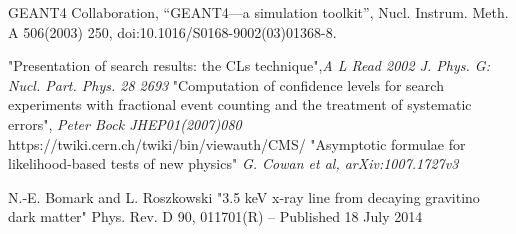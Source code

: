 \begin{thebibliography}{9}
 GEANT4 Collaboration, “GEANT4—a simulation toolkit”, Nucl. Instrum. Meth. A 506(2003) 250, doi:10.1016/S0168-9002(03)01368-8.

 "Presentation of search results: the CLs technique",\textit{A L Read 2002 J. Phys. G: Nucl. Part. Phys. 28 2693}
 "Computation of confidence levels for search experiments with fractional event counting and the treatment of systematic errors", \textit{Peter Bock JHEP01(2007)080}
 https://twiki.cern.ch/twiki/bin/viewauth/CMS/
  "Asymptotic formulae for likelihood-based tests of new physics" \textit{G. Cowan et al, arXiv:1007.1727v3}

 N.-E. Bomark and L. Roszkowski "3.5 keV x-ray line from decaying gravitino dark matter" Phys. Rev. D 90, 011701(R) – Published 18 July 2014

\end{thebibliography}